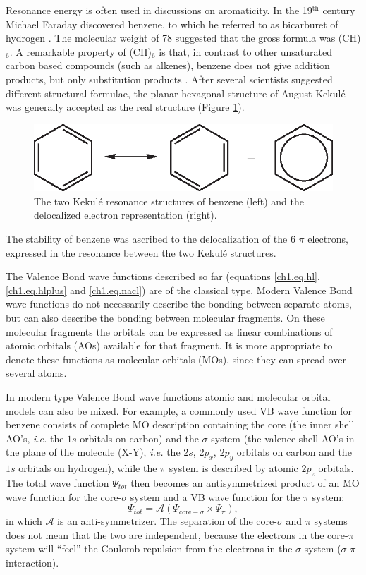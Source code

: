 Resonance energy is often used in discussions on aromaticity. In the 19$^\mathrm{th}$ century Michael Faraday discovered benzene, to which he referred to as bicarburet of hydrogen \cite{faraday,bicarburet}. The molecular weight of 78 suggested that the gross formula was (CH)$_6$. A remarkable property of (CH)$_6$ is that, in contrast to other unsaturated carbon based compounds (such as alkenes), benzene does not give addition products, but only substitution products \cite{bruice}. After several scientists suggested different structural formulae, the planar hexagonal structure of August Kekul\'e \cite{kekule} was generally accepted as the real structure (Figure \ref{ch1.fig.benzene}). 
\begin{figure}[htdp]
\center
\includegraphics{introduction/figures/benzene.eps}
\caption{The two Kekul\'e resonance structures of benzene (left) and the delocalized electron representation (right).}
\label{ch1.fig.benzene}
\end{figure}
The stability of benzene was ascribed to the delocalization of the 6 $\pi$ electrons, expressed in the resonance between the two Kekul\'e structures.

The Valence Bond wave functions described so far (equations \ref{ch1.eq.hl},\ref{ch1.eq.hlplus} and \ref{ch1.eq.nacl}) are of the classical type. Modern Valence Bond wave functions do not necessarily describe the bonding between separate atoms, but can also describe the bonding between molecular fragments. On these molecular fragments the orbitals can be expressed as linear combinations of atomic orbitals (AOs) available for that fragment. It is more appropriate to denote these functions as molecular orbitals (MOs), since they can spread over several atoms. 

In modern type Valence Bond wave functions atomic and molecular orbital models can also be mixed. For example, a commonly used VB wave function for benzene consists of complete MO description containing the core (the inner shell AO's, \textit{i.e.} the $1s$ orbitals on carbon) and the $\sigma$ system (the valence shell AO's in the plane of the molecule (X-Y), \textit{i.e.} the $2s$, $2p_x$, $2p_y$ orbitals on carbon and the $1s$ orbitals on hydrogen), while the $\pi$ system is described by atomic $2p_z$ orbitals. The total wave function $\Psi_{tot}$ then becomes an antisymmetrized product of an MO wave function for the core-$\sigma$ system and a VB wave function for the $\pi$ system:
\begin{equation}
\Psi_{tot} = \mathcal{A}(\Psi_{\mathrm{core}-\sigma} \times \Psi_{\pi}),
\label{ch1.eq.prodbenzene}
\end{equation}
in which $\mathcal{A}$ is an anti-symmetrizer. The separation of the core-$\sigma$ and $\pi$ systems does not mean that the two are independent, because the electrons in the core-$\pi$ system will ``feel'' the Coulomb repulsion from the electrons in the $\sigma$ system ($\sigma$-$\pi$ interaction).

